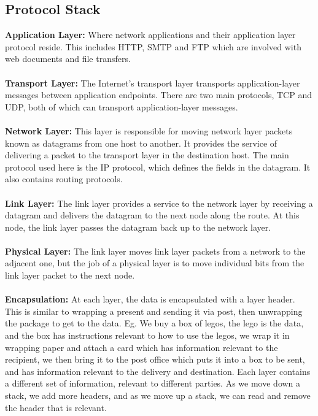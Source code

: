 \documentclass[]{article}
\begin{document}
\subsection{Protocol Stack}
\textcolor{TealBlue}{\textbf{Application Layer:}} Where network applications and their application layer protocol reside. This includes HTTP, SMTP and FTP which are involved with web documents and file transfers. \\\\
\textcolor{TealBlue}{\textbf{Transport Layer:}} The Internet's transport layer transports application-layer messages between application endpoints. There are two main protocols, TCP and UDP, both of which can transport application-layer messages. \\\\
\textcolor{TealBlue}{\textbf{Network Layer:}} This layer is responsible for moving network layer packets known as datagrams from one host to another. It provides the service of delivering a packet to the transport layer in the destination host. The main protocol used here is the IP protocol, which defines the fields in the datagram. It also contains routing protocols. \\\\
\textcolor{TealBlue}{\textbf{Link Layer:}} The link layer provides a service to the network layer by receiving a datagram and delivers the datagram to the next node along the route. At this node, the link layer passes the datagram back up to the network layer. \\\\
\textcolor{TealBlue}{\textbf{Physical Layer:}} The link layer moves link layer packets from a network to the adjacent one, but the job of a physical layer is to move individual bits from the link layer packet to the next node. \\\\
\textcolor{TealBlue}{\textbf{Encapsulation:}} At each layer, the data is encapsulated with a layer header. This is similar to wrapping a present and sending it via post, then unwrapping the package to get to the data. Eg. We buy a box of legos, the lego is the data, and the box has instructions relevant to how to use the legos, we wrap it in wrapping paper and attach a card which has information relevant to the recipient, we then bring it to the post office which puts it into a box to be sent, and has information relevant to the delivery and destination. Each layer contains a different set of information, relevant to different parties. As we move down a stack, we add more headers, and as we move up a stack, we can read and remove the header that is relevant.
\newpage
\end{document}
